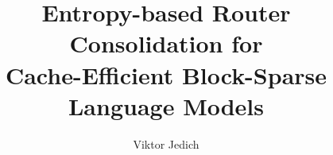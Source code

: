\documentclass[11pt]{article}
\begin{document}
\title{Entropy-based Router Consolidation for\\
       Cache-Efficient Block-Sparse Language Models}
\author{Viktor Jedich}
\date{}
\maketitle

\begin{abstract}

\end{abstract}










\end{document}
